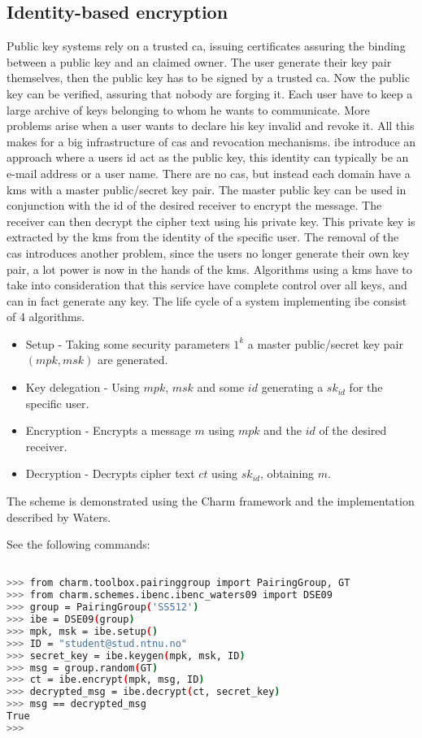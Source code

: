 \subsection{Identity-based encryption}\label{subsec:IBE}
Public key systems rely on a trusted \gls{ca}, issuing certificates assuring the binding between a public key and an claimed owner. The user generate their key pair themselves, then the public key has to be signed by a trusted \glsdesc{ca}. Now the public key can be verified, assuring that nobody are forging it. Each user have to keep a large archive of keys belonging to whom he wants to communicate. More problems arise when a user wants to declare his key invalid and revoke it. All this makes for a big infrastructure of \glspl{ca} and revocation mechanisms. \Gls{ibe}\cite{DBLP:ibe} introduce an approach where a users id act as the public key, this identity can typically be an e-mail address or a user name. There are no \glspl{ca}, but instead each domain have a \gls{kms} with a master public/secret key pair. The master public key can be used in conjunction with the id of the desired receiver to encrypt the message. The receiver can then decrypt the cipher text using his private key. This private key is extracted by the \gls{kms} from the identity of the specific user. The removal of the \glspl{ca} introduces another problem, since the users no longer generate their own key pair, a lot power is now in the hands of the \gls{kms}. Algorithms using a \gls{kms} have to take into consideration that this service have complete control over all keys, and can in fact generate any key. The life cycle of a system implementing \gls{ibe} consist of 4 algorithms. 

\begin{itemize}
\item Setup - Taking some security parameters $1^k$ a master public/secret key pair $(mpk, msk)$ are generated.
\item Key delegation - Using $mpk$, $msk$ and some $id$ generating a $sk_{id}$ for the specific user. 
\item Encryption - Encrypts a message $m$ using $mpk$ and the $id$ of the desired receiver. 
\item Decryption - Decrypts cipher text $ct$ using $sk_{id}$, obtaining $m$. 
\end{itemize}

The scheme is demonstrated using the Charm framework and the implementation described by Waters\cite{ibe_waters09}.

\noindent See the following commands:
\begin{lstlisting}[language=bash]

>>> from charm.toolbox.pairinggroup import PairingGroup, GT
>>> from charm.schemes.ibenc.ibenc_waters09 import DSE09
>>> group = PairingGroup('SS512')
>>> ibe = DSE09(group)
>>> mpk, msk = ibe.setup()
>>> ID = "student@stud.ntnu.no"
>>> secret_key = ibe.keygen(mpk, msk, ID)
>>> msg = group.random(GT)
>>> ct = ibe.encrypt(mpk, msg, ID)
>>> decrypted_msg = ibe.decrypt(ct, secret_key)
>>> msg == decrypted_msg
True
>>> 


\end{lstlisting}



